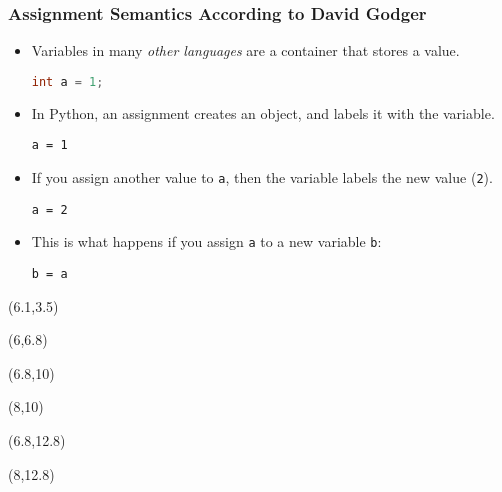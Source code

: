 \documentclass{beamer}
\begin{document}
\begin{frame}[fragile]
\frametitle{Assignment Semantics According to 
  David Godger\cite{Godger2008}}
\begin{itemize}

\item<1-> Variables in many \emph{other languages} are a container
      that stores a value.
\begin{lstlisting}[language=C]
int a = 1;
\end{lstlisting}

\item<2-> In Python, an assignment creates an object,
      and labels it with the variable.
\begin{lstlisting}
a = 1
\end{lstlisting}

\item<3-> If you assign another value to \lstinline{a}, then
      the variable labels the new value (\lstinline{2}).
\begin{lstlisting}
a = 2
\end{lstlisting}

\item<4-> This is what happens if you assign \lstinline{a}
      to a new variable \lstinline{b}:
\begin{lstlisting}
b = a
\end{lstlisting}
\end{itemize}

\begin{textblock}{5}(6.1,3.5)
\end{textblock}

\begin{textblock}{5}(6,6.8)
\end{textblock}

\begin{textblock}{5}(6.8,10)
\end{textblock}

\begin{textblock}{5}(8,10)
\end{textblock}

\begin{textblock}{5}(6.8,12.8)
\end{textblock}

\begin{textblock}{5}(8,12.8)
\end{textblock}

\end{frame}
\end{document}
